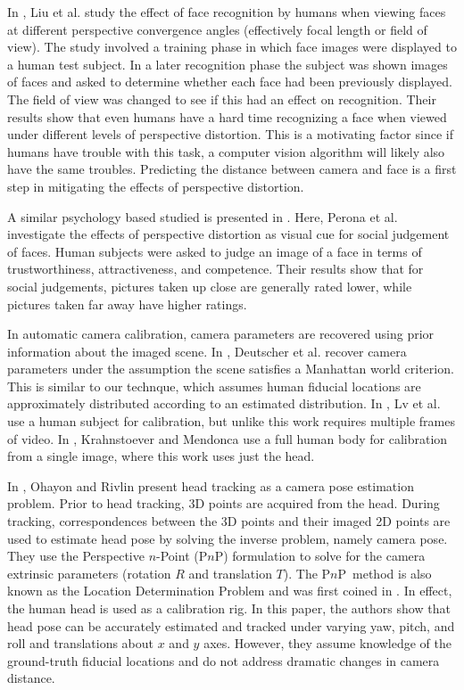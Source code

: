 \documentclass[runningheads]{llncs}
\newcommand {\PnP} {P$n$P}
\begin{document}
In \cite{liu2003face,liu2006face}, Liu et al. study the effect of face recognition by humans when viewing faces at different perspective convergence angles (effectively focal length or field of view). 
The study involved a training phase in which face images were displayed to a human test subject.
In a later recognition phase the subject was shown images of faces and asked to determine whether each face had been previously displayed.
The field of view was changed to see if this had an effect on recognition. 
Their results show that even humans have a hard time recognizing a face when viewed under different levels of perspective distortion.  
This is a motivating factor since if humans have trouble with this task, a computer vision algorithm will likely also have the same troubles.  
Predicting the distance between camera and face is a first step in mitigating the effects of perspective distortion.

A similar psychology based studied is presented in \cite{perona2007new,bryan2012perspective}. 
Here, Perona et al. investigate the effects of perspective distortion as visual cue for social judgement of faces.  
Human subjects were asked to judge an image of a face in terms of trustworthiness, attractiveness, and competence.  
Their results show that for social judgements, pictures taken up close are generally rated lower, while pictures taken far away have higher ratings.

In automatic camera calibration, camera parameters are recovered using prior information about the imaged scene.
In \cite{deutscher2002automatic}, Deutscher et al. recover camera parameters under the assumption the scene satisfies a Manhattan world criterion.
This is similar to our technque, which assumes human fiducial locations are approximately distributed according to an estimated distribution. 
In \cite{lv2006camera}, Lv et al. use a human subject for calibration, but unlike this work requires multiple frames of video.
In \cite{krahnstoever2005bayesian}, Krahnstoever and Mendonca use a full human body for calibration from a single image, where this work uses just the head.

In \cite{ohayon2006robust}, Ohayon and Rivlin present head tracking as a camera pose estimation problem.  
Prior to head tracking, 3D points are acquired from the head.  
During tracking, correspondences between the 3D points and their imaged 2D points are used to estimate head pose by solving the inverse problem, namely camera pose. 
They use the Perspective $n$-Point (\PnP) formulation to solve for the camera extrinsic parameters (rotation $R$ and translation $T$).  
The \PnP~method is also known as the Location Determination Problem and was first coined in \cite{ransac}.  
In effect, the human head is used as a calibration rig.  
In this paper, the authors show that head pose can be accurately estimated and tracked under varying yaw, pitch, and roll and translations about $x$ and $y$ axes. 
However, they assume knowledge of the ground-truth fiducial locations and do not address dramatic changes in camera distance.
\end{document}
